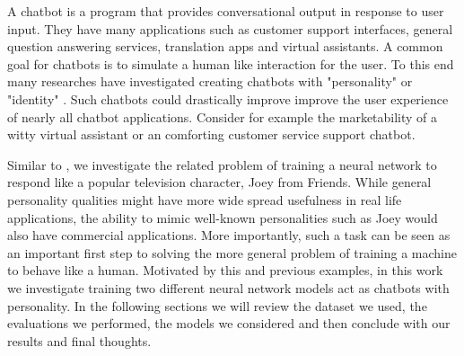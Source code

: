 	A chatbot is a program that provides conversational output in response to user input.
	They have many applications such as customer support interfaces, general question answering services, translation apps and virtual assistants.
	A common goal for chatbots is to simulate a human like interaction for the user.
	To this end many researches have investigated creating chatbots with "personality" or "identity" \cite{Li2016, LINH2019, QianHZXZ17, ZhouHZZL17,NMC2017, 8614104}.
	Such chatbots could drastically improve improve the user experience of nearly all chatbot applications.
	Consider for example the marketability of a witty virtual assistant or an comforting customer service support chatbot.

	Similar to \cite{NMC2017, Li2016, 8614104}, we investigate the related problem of training a neural network to respond like a popular television character, Joey from Friends.
	While general personality qualities might have more wide spread usefulness in real life applications, the ability to mimic well-known personalities such as Joey would also have commercial applications.
	More importantly, such a task can be seen as an important first step to solving the more general problem of training a machine to behave like a human.
	Motivated by this and previous examples, in this work we investigate training two different neural network models act as chatbots with personality.
	In the following sections we will review the dataset we used, the evaluations we performed, the models we considered and then conclude with our results and final thoughts.
	

